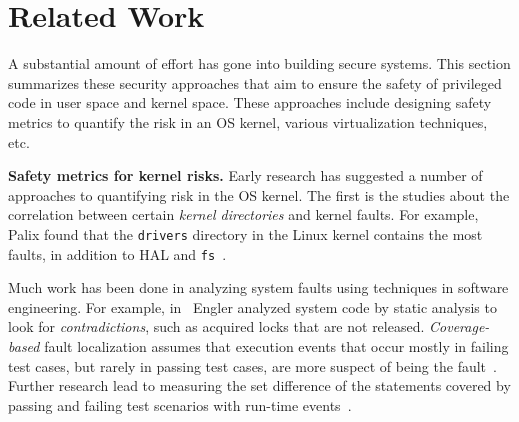 \section{Related Work}
\label{sec.related_work}

A substantial amount of effort has gone into building secure systems. 
This section summarizes these security approaches 
that aim to ensure the safety of privileged code in user space and kernel space.
These approaches include designing safety metrics to quantify the risk in an 
OS kernel, various virtualization techniques, etc.


\textbf{Safety metrics for kernel risks.}
Early research has suggested a number of approaches to quantifying risk 
in the OS kernel. The first is the studies about the correlation between certain 
\textit{kernel directories} and kernel faults. For example, 
Palix found that the \texttt{drivers} directory in the Linux kernel contains the
most faults, in addition to HAL and \texttt{fs}~\cite{palix2011faults}.

Much work has been done in analyzing system faults using techniques in 
software engineering. For example, 
in~\cite{engler2001bugs} Engler analyzed system code by static analysis
to look for \textit{contradictions}, such as acquired locks that are
not released.
%
%
%
\textit{Coverage-based} fault localization assumes that execution events that occur mostly in failing
test cases, but rarely in passing test cases, are more {suspect}
of being the fault~\cite{jones2002visualization}. Further research lead to measuring the set
difference of the statements covered by passing and failing test scenarios with run-time events~\cite{agrawal1995fault, jones2005empirical, liblit2005scalable}.


